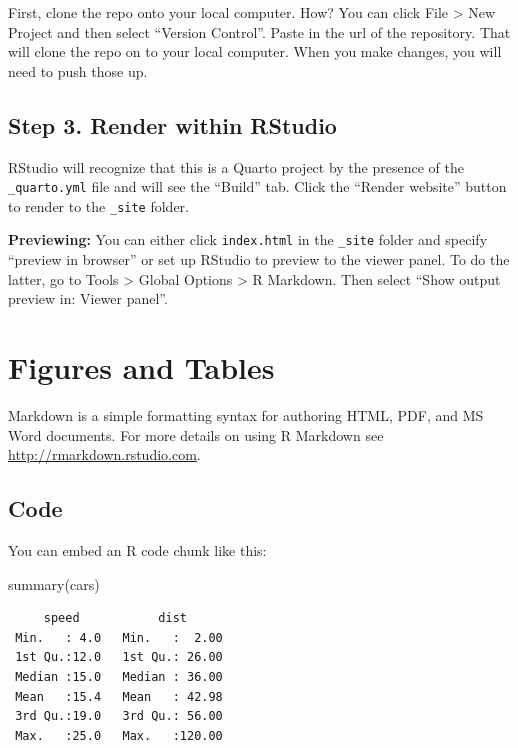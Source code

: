\documentclass[
  letterpaper,
  oneside,
  open=any]{scrbook}
\newenvironment{Shaded}{\begin{snugshade}}{\end{snugshade}}
\newcommand{\FunctionTok}[1]{\textcolor[rgb]{0.28,0.35,0.67}{#1}}
\newcommand{\NormalTok}[1]{\textcolor[rgb]{0.00,0.23,0.31}{#1}}
\begin{document}
First, clone the repo onto your local computer. How? You can click File
\textgreater{} New Project and then select ``Version Control''. Paste in
the url of the repository. That will clone the repo on to your local
computer. When you make changes, you will need to push those up.

\section{Step 3. Render within
RStudio}\label{step-3.-render-within-rstudio}

RStudio will recognize that this is a Quarto project by the presence of
the \texttt{\_quarto.yml} file and will see the ``Build'' tab. Click the
``Render website'' button to render to the \texttt{\_site} folder.

\textbf{Previewing:} You can either click \texttt{index.html} in the
\texttt{\_site} folder and specify ``preview in browser'' or set up
RStudio to preview to the viewer panel. To do the latter, go to Tools
\textgreater{} Global Options \textgreater{} R Markdown. Then select
``Show output preview in: Viewer panel''.


\chapter{Figures and Tables}\label{figures-and-tables}

Markdown is a simple formatting syntax for authoring HTML, PDF, and MS
Word documents. For more details on using R Markdown see
\url{http://rmarkdown.rstudio.com}.

\section{Code}\label{code}

You can embed an R code chunk like this:

\begin{Shaded}
\begin{Highlighting}[]
\FunctionTok{summary}\NormalTok{(cars)}
\end{Highlighting}
\end{Shaded}

\begin{verbatim}
     speed           dist       
 Min.   : 4.0   Min.   :  2.00  
 1st Qu.:12.0   1st Qu.: 26.00  
 Median :15.0   Median : 36.00  
 Mean   :15.4   Mean   : 42.98  
 3rd Qu.:19.0   3rd Qu.: 56.00  
 Max.   :25.0   Max.   :120.00  
\end{verbatim}
\end{document}
